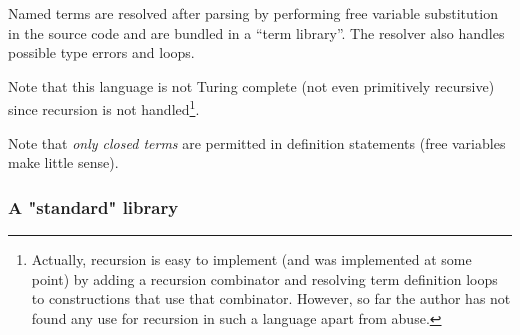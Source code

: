 \documentclass[main.tex]{subfiles}
\begin{document}
Named terms are resolved after parsing by performing free variable substitution
in the source code and are bundled in a ``term library''. The resolver also
handles possible type errors and loops.

Note that this language is not Turing complete (not even primitively recursive)
since recursion is not handled\footnote{
    Actually, recursion is easy to implement (and was implemented at some point)
    by adding a recursion combinator
    and resolving term definition loops to constructions that use that combinator.
    However, so far the author has not found any use for recursion in such a language
    apart from abuse.
}.

Note that \emph{only closed terms} are permitted in definition statements
(free variables make little sense).

\subsubsection{A "standard" library}
\label{stdlib}
\end{document}
